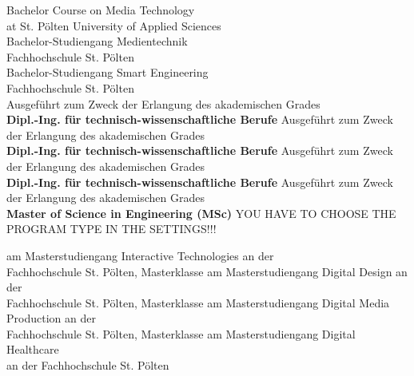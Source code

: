 \begin{center}
\vspace{1.3cm}
\ifuseBachelorMediaTechnologiesOne
	\fontsize{11pt}{15pt}\selectfont Bachelor Course on Media Technology\\
at St. Pölten University of Applied Sciences\\  
\else
	\ifuseBachelorMediaTechnologiesTwo
		\fontsize{11pt}{15pt}\selectfont Bachelor-Studiengang Medientechnik\\
Fachhochschule St. Pölten\\  
\else
	\ifuseBachelorSmartEngineeringOne
    	\fontsize{11pt}{15pt}\selectfont Bachelor-Studiengang Smart Engineering\\
Fachhochschule St. Pölten\\ 
\else
	\ifuseMasterInteractiveTechnologies
		\fontsize{11pt}{15pt}\selectfont Ausgeführt zum Zweck der Erlangung des akademischen Grades\\
		\textbf{Dipl.-Ing. für technisch-wissenschaftliche Berufe}
\else
	\ifuseMasterDigitalDesign
		\fontsize{11pt}{15pt}\selectfont Ausgeführt zum Zweck der Erlangung des akademischen Grades\\
		\textbf{Dipl.-Ing. für technisch-wissenschaftliche Berufe}	
\else
    \ifuseMasterDigitalMediaProduction
		\fontsize{11pt}{15pt}\selectfont Ausgeführt zum Zweck der Erlangung des akademischen Grades\\
		\textbf{Dipl.-Ing. für technisch-wissenschaftliche Berufe}	
\else
	\ifuseMasterDigitalHealthCare
    	\fontsize{11pt}{15pt}\selectfont Ausgeführt zum Zweck der Erlangung des akademischen Grades\\
		\textbf{Master of Science in Engineering (MSc)}
    \else
        \LARGE{YOU HAVE TO CHOOSE THE PROGRAM TYPE IN THE SETTINGS!!!}
\fi\fi\fi\fi\fi\fi\fi

\vspace{4mm}

\ifuseMasterInteractiveTechnologies
	am Masterstudiengang Interactive Technologies an der\\ 
Fachhochschule St. Pölten, Masterklasse \specialization
\else
    \ifuseMasterDigitalDesign
	am Masterstudiengang Digital Design an der\\ 
Fachhochschule St. Pölten, Masterklasse \specialization
\else
    \ifuseMasterDigitalMediaProduction
	am Masterstudiengang Digital Media Production an der\\ 
Fachhochschule St. Pölten, Masterklasse \specialization
\else
	\ifuseMasterDigitalHealthCare
		am Masterstudiengang Digital Healthcare\\ 
an der Fachhochschule St. Pölten
    \else
        

\end{center}
